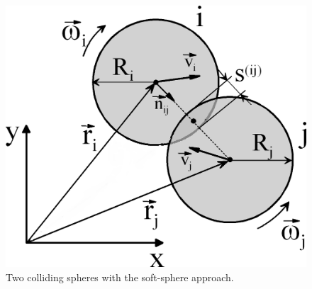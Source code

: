 \begin{figure}[!h]
\centering
\includegraphics[width=.6\columnwidth]{images/109twospheres}
\caption[Two spheres]{Two colliding spheres with the soft-sphere approach.}
\label{fig:109twospheres}
\end{figure}